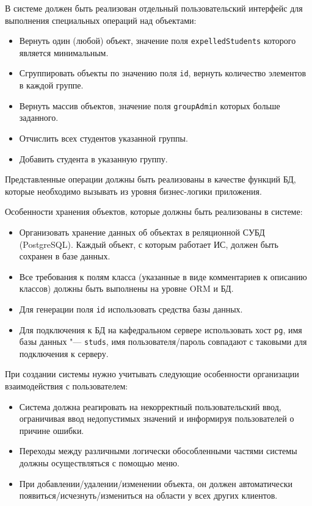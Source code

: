 \documentclass[a4paper,12pt]{article}
\begin{document}
В системе должен быть реализован отдельный пользовательский интерфейс для выполнения специальных операций над объектами:
\begin{itemize}
  \item Вернуть один (любой) объект, значение поля \texttt{expelledStudents} которого является минимальным.
  \item Сгруппировать объекты по значению поля \texttt{id}, вернуть количество элементов в каждой группе.
  \item Вернуть массив объектов, значение поля \texttt{groupAdmin} которых больше заданного.
  \item Отчислить всех студентов указанной группы.
  \item Добавить студента в указанную группу.
\end{itemize}

Представленные операции должны быть реализованы в качестве функций БД, которые необходимо вызывать из уровня бизнес-логики приложения.

Особенности хранения объектов, которые должны быть реализованы в системе:
\begin{itemize}
  \item Организовать хранение данных об объектах в реляционной СУБД (PostgreSQL). Каждый объект, с которым работает ИС, должен быть сохранен в базе данных.
  \item Все требования к полям класса (указанные в виде комментариев к описанию классов) должны быть выполнены на уровне ORM и БД.
  \item Для генерации поля \texttt{id} использовать средства базы данных.
  \item Для подключения к БД на кафедральном сервере использовать хост \texttt{pg}, имя базы данных "--- \texttt{studs}, имя пользователя/пароль совпадают с таковыми для подключения к серверу.
\end{itemize}

При создании системы нужно учитывать следующие особенности организации взаимодействия с пользователем:
\begin{itemize}
  \item Система должна реагировать на некорректный пользовательский ввод, ограничивая ввод недопустимых значений и информируя пользователей о причине ошибки.
  \item Переходы между различными логически обособленными частями системы должны осуществляться с помощью меню.
  \item При добавлении/удалении/изменении объекта, он должен автоматически появиться/исчезнуть/измениться на области у всех других клиентов.
\end{itemize}
\end{document}
